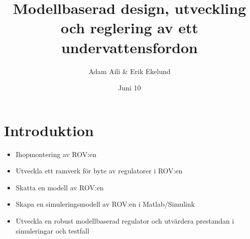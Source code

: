 \documentclass[11pt,aspectratio=169]{beamer}
\author{Adam Aili \& Erik Ekelund}
\title{Modellbaserad design, utveckling och reglering av ett undervattensfordon}
\date{Juni 10}
\begin{document}
\begin{frame}
\titlepage
{}
\end{frame}
\section{Introduktion}
\begin{frame}
\begin{itemize}
\item Ihopmontering av ROV:en
\item Utveckla ett ramverk för byte av regulatorer i ROV:en
\item Skatta en modell av ROV:en
\item Skapa en simuleringsmodell av ROV:en i Matlab/Simulink
\item Utveckla en robust modellbaserad regulator och utvärdera prestandan i simuleringar och testfall
\end{itemize}
\end{frame}


\end{document}
